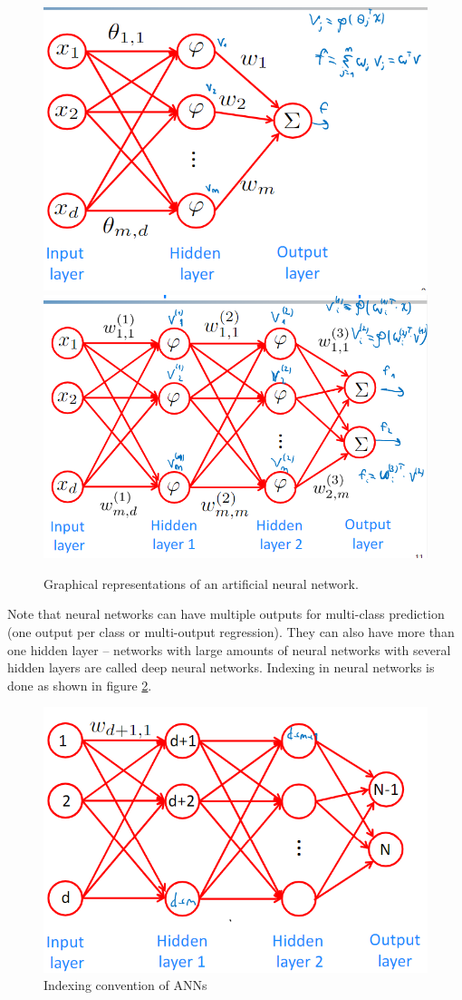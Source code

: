 \documentclass[a4paper,10pt,twoside]{article}
\begin{document}
\begin{figure}
    \includegraphics[width=.5\textwidth]{figures/ann-graph-representation.png}
    \includegraphics[width=.5\textwidth]{figures/two-layer-ann-representation.png}
    \caption{Graphical representations of an artificial neural network.}
    \label{graphical-representation-ann}
\end{figure}
Note that neural networks can have multiple outputs for multi-class prediction (one output per class or multi-output regression). They can also have more than one hidden layer -- networks with large amounts of neural networks with several hidden layers are called deep neural networks. Indexing in neural networks is done as shown in figure \ref{indexing-ann}.

\begin{figure}
    \centering
    \includegraphics[width=.5\textwidth]{figures/indexing-ann.png}
    \caption{Indexing convention of ANNs}
    \label{indexing-ann}
\end{figure}
\end{document}
